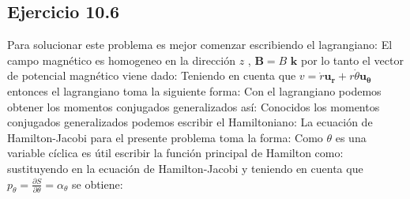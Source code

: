 \subsection*{Ejercicio 10.6}
Para solucionar este problema es mejor comenzar escribiendo el lagrangiano:
El campo magn\'etico es homogeneo en la direcci\'on $z$ , $\textbf{B}=B \textbf{ k}$ por lo tanto el vector de potencial magn\'etico viene dado:
Teniendo en cuenta que $v=\dot r \mathbf{u_{r}}+r \dot \theta \mathbf{u_{\theta}} $ entonces el lagrangiano toma la siguiente forma:
Con el lagrangiano podemos obtener los momentos conjugados generalizados as\'i:
Conocidos los momentos conjugados generalizados podemos escribir el Hamiltoniano:
La ecuaci\'on de Hamilton-Jacobi para el presente problema toma la forma:
Como $\theta$ es una variable c\'iclica es \'util escribir la funci\'on principal de Hamilton como:
sustituyendo en la ecuaci\'on de Hamilton-Jacobi y teniendo en cuenta que $p_\theta=\frac{\partial S}{\partial \theta}=\alpha_\theta$ se obtiene:
